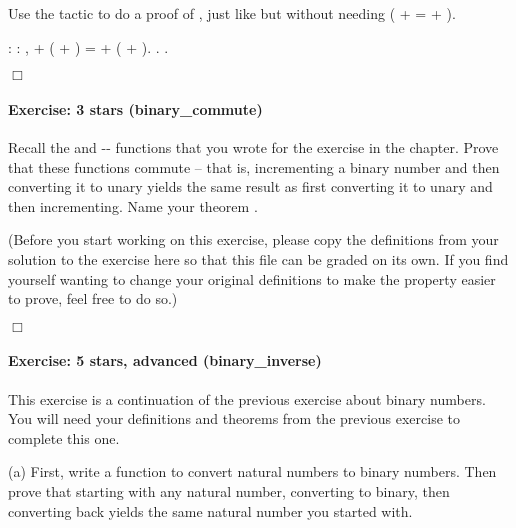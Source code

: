 \documentclass[12pt]{report}
\begin{document}
   Use the  tactic to do a proof of , just like
    but without needing  ( +  =  + ). 
\begin{coqdoccode}
\coqdocemptyline
\coqdocnoindent
{}  : \coqdockw{\ensuremath{\forall}}    : , \coqdoceol
\coqdocindent{1.00em}
 + ( + ) =  + ( + ).\coqdoceol
\coqdocnoindent
{}.\coqdoceol
 .\coqdoceol
\end{coqdoccode}
\ensuremath{\Box} 

\paragraph{Exercise: 3 stars (binary\_commute)}

 Recall the  and -- functions that you
    wrote for the  exercise in the  chapter.  Prove
    that these functions commute -- that is, incrementing a binary
    number and then converting it to unary yields the same result as
    first converting it to unary and then incrementing.
    Name your theorem .


    (Before you start working on this exercise, please copy the
    definitions from your solution to the  exercise here so
    that this file can be graded on its own.  If you find yourself
    wanting to change your original definitions to make the property
    easier to prove, feel free to do so.) \begin{coqdoccode}
\coqdocemptyline
\end{coqdoccode}
\ensuremath{\Box} 

\paragraph{Exercise: 5 stars, advanced (binary\_inverse)}

 This exercise is a continuation of the previous exercise about
    binary numbers.  You will need your definitions and theorems from
    the previous exercise to complete this one.


    (a) First, write a function to convert natural numbers to binary
        numbers.  Then prove that starting with any natural number,
        converting to binary, then converting back yields the same
        natural number you started with.
\end{document}
